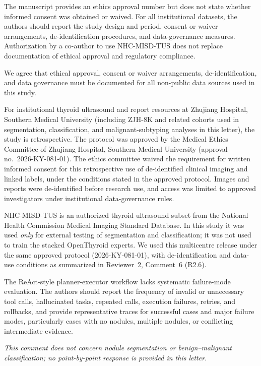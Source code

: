 \begin{reviewercomment}
The manuscript provides an ethics approval number but does not state whether informed consent was obtained or waived. For all institutional datasets, the authors should report the study design and period, consent or waiver arrangements, de-identification procedures, and data-governance measures. Authorization by a co-author to use NHC-MISD-TUS does not replace documentation of ethical approval and regulatory compliance.
\end{reviewercomment}
\begin{authorresponse}
We agree that ethical approval, consent or waiver arrangements, de-identification, and data governance must be documented for all non-public data sources used in this study.\par
For institutional thyroid ultrasound and report resources at Zhujiang Hospital, Southern Medical University (including ZJH-8K and related cohorts used in segmentation, classification, and malignant-subtyping analyses in this letter), the study is retrospective. The protocol was approved by the Medical Ethics Committee of Zhujiang Hospital, Southern Medical University (approval no.\ 2026-KY-081-01). The ethics committee waived the requirement for written informed consent for this retrospective use of de-identified clinical imaging and linked labels, under the conditions stated in the approved protocol. Images and reports were de-identified before research use, and access was limited to approved investigators under institutional data-governance rules.\par
NHC-MISD-TUS is an authorized thyroid ultrasound subset from the National Health Commission Medical Imaging Standard Database. In this study it was used \emph{only} for external testing of segmentation and classification; it was not used to train the stacked OpenThyroid experts. We used this multicentre release under the same approved protocol (2026-KY-081-01), with de-identification and data-use conditions as summarized in Reviewer~2, Comment~6 (R2.6).\par
\end{authorresponse}

\begin{reviewercomment}
The ReAct-style planner-executor workflow lacks systematic failure-mode evaluation. The authors should report the frequency of invalid or unnecessary tool calls, hallucinated tasks, repeated calls, execution failures, retries, and rollbacks, and provide representative traces for successful cases and major failure modes, particularly cases with no nodules, multiple nodules, or conflicting intermediate evidence.
\end{reviewercomment}
\begin{authorresponse}
\noindent\textit{This comment does not concern nodule segmentation or benign--malignant classification; no point-by-point response is provided in this letter.}
\end{authorresponse}

